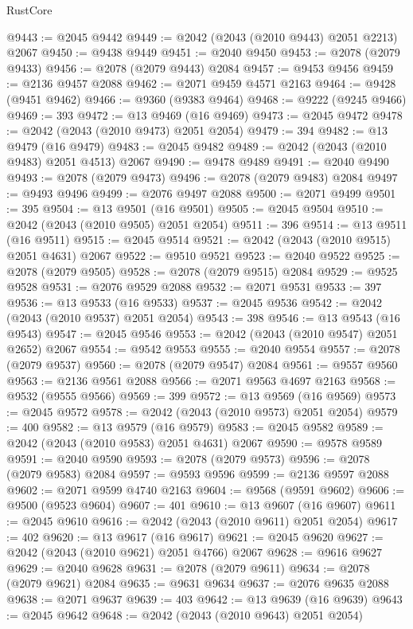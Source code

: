 \begin{lexlean}{RustCore}
\begin{coremodule}
@9443 := @2045 @9442
@9449 := @2042 (@2043 (@2010 @9443) @2051 @2213) @2067
@9450 := @9438 @9449
@9451 := @2040 @9450
@9453 := @2078 (@2079 @9433)
@9456 := @2078 (@2079 @9443) @2084
@9457 := @9453 @9456
@9459 := @2136 @9457 @2088
@9462 := @2071 @9459 @4571 @2163
@9464 := @9428 (@9451 @9462)
@9466 := @9360 (@9383 @9464)
@9468 := @9222 (@9245 @9466)
@9469 := 393
@9472 := @13 @9469 (@16 @9469)
@9473 := @2045 @9472
@9478 := @2042 (@2043 (@2010 @9473) @2051 @2054)
@9479 := 394
@9482 := @13 @9479 (@16 @9479)
@9483 := @2045 @9482
@9489 := @2042 (@2043 (@2010 @9483) @2051 @4513) @2067
@9490 := @9478 @9489
@9491 := @2040 @9490
@9493 := @2078 (@2079 @9473)
@9496 := @2078 (@2079 @9483) @2084
@9497 := @9493 @9496
@9499 := @2076 @9497 @2088
@9500 := @2071 @9499
@9501 := 395
@9504 := @13 @9501 (@16 @9501)
@9505 := @2045 @9504
@9510 := @2042 (@2043 (@2010 @9505) @2051 @2054)
@9511 := 396
@9514 := @13 @9511 (@16 @9511)
@9515 := @2045 @9514
@9521 := @2042 (@2043 (@2010 @9515) @2051 @4631) @2067
@9522 := @9510 @9521
@9523 := @2040 @9522
@9525 := @2078 (@2079 @9505)
@9528 := @2078 (@2079 @9515) @2084
@9529 := @9525 @9528
@9531 := @2076 @9529 @2088
@9532 := @2071 @9531
@9533 := 397
@9536 := @13 @9533 (@16 @9533)
@9537 := @2045 @9536
@9542 := @2042 (@2043 (@2010 @9537) @2051 @2054)
@9543 := 398
@9546 := @13 @9543 (@16 @9543)
@9547 := @2045 @9546
@9553 := @2042 (@2043 (@2010 @9547) @2051 @2652) @2067
@9554 := @9542 @9553
@9555 := @2040 @9554
@9557 := @2078 (@2079 @9537)
@9560 := @2078 (@2079 @9547) @2084
@9561 := @9557 @9560
@9563 := @2136 @9561 @2088
@9566 := @2071 @9563 @4697 @2163
@9568 := @9532 (@9555 @9566)
@9569 := 399
@9572 := @13 @9569 (@16 @9569)
@9573 := @2045 @9572
@9578 := @2042 (@2043 (@2010 @9573) @2051 @2054)
@9579 := 400
@9582 := @13 @9579 (@16 @9579)
@9583 := @2045 @9582
@9589 := @2042 (@2043 (@2010 @9583) @2051 @4631) @2067
@9590 := @9578 @9589
@9591 := @2040 @9590
@9593 := @2078 (@2079 @9573)
@9596 := @2078 (@2079 @9583) @2084
@9597 := @9593 @9596
@9599 := @2136 @9597 @2088
@9602 := @2071 @9599 @4740 @2163
@9604 := @9568 (@9591 @9602)
@9606 := @9500 (@9523 @9604)
@9607 := 401
@9610 := @13 @9607 (@16 @9607)
@9611 := @2045 @9610
@9616 := @2042 (@2043 (@2010 @9611) @2051 @2054)
@9617 := 402
@9620 := @13 @9617 (@16 @9617)
@9621 := @2045 @9620
@9627 := @2042 (@2043 (@2010 @9621) @2051 @4766) @2067
@9628 := @9616 @9627
@9629 := @2040 @9628
@9631 := @2078 (@2079 @9611)
@9634 := @2078 (@2079 @9621) @2084
@9635 := @9631 @9634
@9637 := @2076 @9635 @2088
@9638 := @2071 @9637
@9639 := 403
@9642 := @13 @9639 (@16 @9639)
@9643 := @2045 @9642
@9648 := @2042 (@2043 (@2010 @9643) @2051 @2054)

\end{coremodule}
\end{lexlean}
